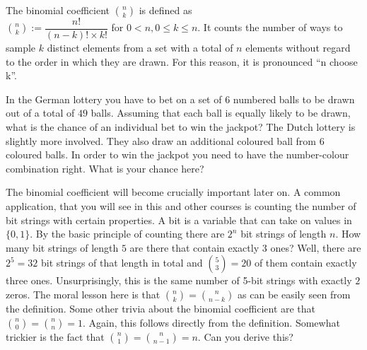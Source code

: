 \documentclass[a4paper,11pt,leqno]{report}
\begin{document}
\begin{Definition}
The binomial coefficient $ \binom{n}{k} $ is defined as \\ $ \binom{n}{k} := \dfrac{n!}{(n-k)!\times k!} $ for $ 0 < n, 0 \leq k \leq n $. 
It counts the number of ways
to sample $ k $ distinct elements from a set with a total of $ n $ elements without regard to the order in which they are drawn.
For this reason, it is pronounced ``n choose k''.
\end{Definition}

\begin{Exercise}
In the German lottery you have to bet on a set of $ 6 $ numbered balls to be drawn out of a total of $ 49 $ balls. Assuming that
each ball is equally likely to be drawn, what is the chance of an individual bet to win the jackpot? The Dutch lottery is 
slightly more involved. They also draw an additional coloured ball from $ 6 $ coloured balls. In order to win the jackpot you need to have 
the number-colour combination right. What is your chance here?
\end{Exercise}

The binomial coefficient will become crucially important later on. A common application, that you will see in this and other courses
is counting the number of bit strings with certain properties. A bit is a variable that can take on values in $ \{0,1\} $. By the 
basic principle of counting there are $ 2^{n} $ bit strings of length $ n $. How many bit strings of length $ 5 $ are there that contain
exactly $ 3 $ ones? Well, there are $ 2^{5} = 32 $ bit strings of that length in total and $ \binom{5}{3} = 20 $ of them contain exactly
three ones. Unsurprisingly, this is the same number of 5-bit strings with exactly $ 2 $ zeros. 
The moral lesson here is that $ \binom{n}{k} = \binom{n}{n-k} $ as can be easily seen from the definition. Some other trivia about the
binomial coefficient are that $ \binom{n}{0} = \binom{n}{n} = 1 $. Again, this follows directly from the definition. Somewhat trickier
is the fact that $ \binom{n}{1} = \binom{n}{n-1} = n $. Can you derive this?
\end{document}
